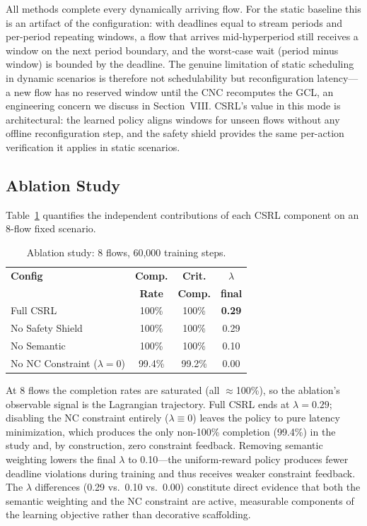 \documentclass[conference]{IEEEtran}
\begin{document}
All methods complete every dynamically arriving flow. For the static baseline this is an artifact of the configuration: with deadlines equal to stream periods and per-period repeating windows, a flow that arrives mid-hyperperiod still receives a window on the next period boundary, and the worst-case wait (period minus window) is bounded by the deadline. The genuine limitation of static scheduling in dynamic scenarios is therefore not schedulability but reconfiguration latency---a new flow has no reserved window until the CNC recomputes the GCL, an engineering concern we discuss in Section~VIII. CSRL's value in this mode is architectural: the learned policy aligns windows for unseen flows without any offline reconfiguration step, and the safety shield provides the same per-action verification it applies in static scenarios.

\subsection{Ablation Study}

Table~\ref{tab:ablation} quantifies the independent contributions of each CSRL component on an 8-flow fixed scenario.

\begin{table}[t]
\centering
\caption{Ablation study: 8 flows, 60,000 training steps.}
\label{tab:ablation}
\begin{tabular}{lccc}
\toprule
\textbf{Config} & \textbf{Comp.} & \textbf{Crit.} & $\lambda$ \\
                & \textbf{Rate} & \textbf{Comp.} & \textbf{final} \\
\midrule
Full CSRL & 100\% & 100\% & \textbf{0.29} \\
No Safety Shield & 100\% & 100\% & 0.29 \\
No Semantic & 100\% & 100\% & 0.10 \\
No NC Constraint ($\lambda{=}0$) & 99.4\% & 99.2\% & 0.00 \\
\bottomrule
\end{tabular}
\end{table}

At 8 flows the completion rates are saturated (all $\approx$100\%), so the ablation's observable signal is the Lagrangian trajectory. Full CSRL ends at $\lambda=0.29$; disabling the NC constraint entirely ($\lambda\equiv0$) leaves the policy to pure latency minimization, which produces the only non-100\% completion (99.4\%) in the study and, by construction, zero constraint feedback. Removing semantic weighting lowers the final $\lambda$ to 0.10---the uniform-reward policy produces fewer deadline violations during training and thus receives weaker constraint feedback. The $\lambda$ differences (0.29 vs.\ 0.10 vs.\ 0.00) constitute direct evidence that both the semantic weighting and the NC constraint are active, measurable components of the learning objective rather than decorative scaffolding.
\end{document}
